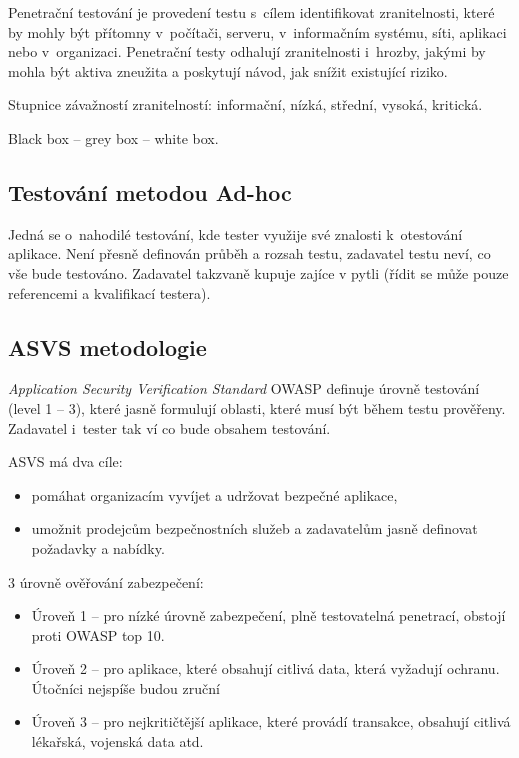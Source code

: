 Penetrační testování je provedení testu s~cílem identifikovat zranitelnosti, které by mohly být přítomny v~počítači, serveru, v~informačním systému, síti, aplikaci nebo v~organizaci.
Penetrační testy odhalují zranitelnosti i~hrozby, jakými by mohla být aktiva zneužita a poskytují návod, jak snížit existující riziko.

Stupnice závažností zranitelností: informační, nízká, střední, vysoká, kritická.

Black box -- grey box -- white box.


\subsection{Testování metodou Ad-hoc}

Jedná se o~nahodilé testování, kde tester využije své znalosti k~otestování aplikace.
Není přesně definován průběh a rozsah testu, zadavatel testu neví, co vše bude testováno.
Zadavatel takzvaně kupuje zajíce v pytli (řídit se může pouze referencemi a kvalifikací testera).


\subsection{ASVS metodologie}

\textit{Application Security Verification Standard} OWASP definuje úrovně testování (level 1 -- 3), které jasně formulují oblasti, které musí být během testu prověřeny.
Zadavatel i~tester tak ví co bude obsahem testování.

ASVS má dva cíle:
\begin{itemize}
    \item pomáhat organizacím vyvíjet a udržovat bezpečné aplikace,
    \item umožnit prodejcům bezpečnostních služeb a zadavatelům jasně definovat požadavky a nabídky.
\end{itemize}

3 úrovně ověřování zabezpečení:
\begin{itemize}
    \item Úroveň 1 -- pro nízké úrovně zabezpečení, plně testovatelná penetrací, obstojí proti OWASP top 10.
    \item Úroveň 2 -- pro aplikace, které obsahují citlivá data, která vyžadují ochranu. Útočníci nejspíše budou zruční
    \item Úroveň 3 -- pro nejkritičtější aplikace, které provádí transakce, obsahují citlivá lékařská, vojenská data atd.
\end{itemize}


